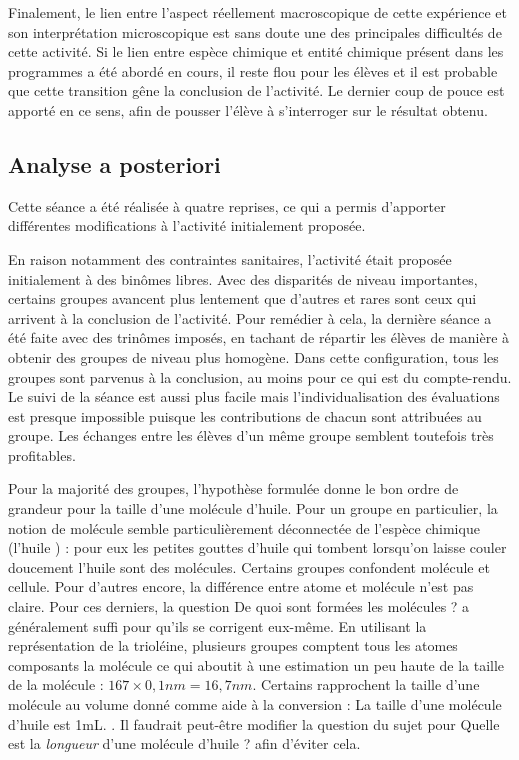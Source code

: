 \documentclass[12pt,a4paper]{article}
\begin{document}
Finalement, le lien entre l'aspect réellement macroscopique de cette expérience et son interprétation microscopique est sans doute une des principales difficultés de cette activité.
Si le lien entre espèce chimique et entité chimique présent dans les programmes a été abordé en cours, il reste flou pour les élèves et il est probable que cette transition gêne la conclusion de l'activité.
Le dernier coup de pouce est apporté en ce sens, afin de pousser l'élève à s'interroger sur le résultat obtenu.

\subsection{Analyse a posteriori}

Cette séance a été réalisée à quatre reprises, ce qui a permis d'apporter différentes modifications à l'activité initialement proposée.

En raison notamment des contraintes sanitaires, l'activité était proposée initialement à des binômes libres.
Avec des disparités de niveau importantes, certains groupes avancent plus lentement que d'autres et rares sont ceux qui arrivent à la conclusion de l'activité.
Pour remédier à cela, la dernière séance a été faite avec des trinômes imposés, en tachant de répartir les élèves de manière à obtenir des groupes de niveau plus homogène.
Dans cette configuration, tous les groupes sont parvenus à la conclusion, au moins pour ce qui est du compte-rendu.
Le suivi de la séance est aussi plus facile mais l'individualisation des évaluations est presque impossible puisque les contributions de chacun sont attribuées au groupe.
Les échanges entre les élèves d'un même groupe semblent toutefois très profitables.

Pour la majorité des groupes, l'hypothèse formulée donne le bon ordre de grandeur pour la taille d'une molécule d'huile.
Pour un groupe en particulier, la notion de molécule semble particulièrement déconnectée de l'espèce chimique (\og l'huile \fg{}) : pour eux les petites gouttes d'huile qui tombent lorsqu'on laisse couler doucement l'huile sont des molécules.
Certains groupes confondent molécule et cellule.
Pour d'autres encore, la différence entre atome et molécule n'est pas claire.
Pour ces derniers, la question \og De quoi sont formées les molécules ? \fg{} a généralement suffi pour qu'ils se corrigent eux-même.
En utilisant la représentation de la trioléine, plusieurs groupes comptent tous les atomes composants la molécule ce qui aboutit à une estimation un peu haute de la taille de la molécule : $167 \times \unit{0{,}1}{nm}=\unit{16{,}7}{nm}$.
Certains rapprochent la taille d'une molécule au volume donné comme aide à la conversion : \og La taille d'une molécule d'huile est \unit{1}{mL}. \fg{}.
Il faudrait peut-être modifier la question du sujet pour \og Quelle est la \emph{longueur} d'une molécule d'huile ? \fg{} afin d'éviter cela. 
\end{document}
